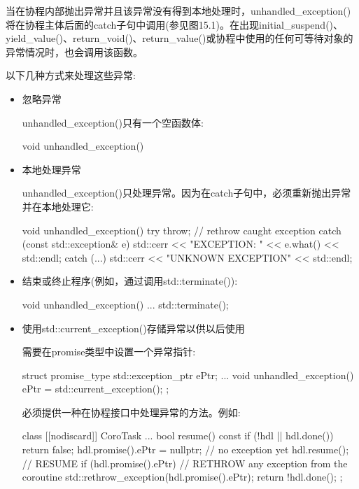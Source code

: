 当在协程内部抛出异常并且该异常没有得到本地处理时，unhandled\_exception()将在协程主体后面的catch子句中调用(参见图15.1)。在出现initial\_suspend()、yield\_value()、return\_void()、return\_value()或协程中使用的任何可等待对象的异常情况时，也会调用该函数。

以下几种方式来处理这些异常:

\begin{itemize}
\item 
忽略异常

unhandled\_exception()只有一个空函数体:

\begin{cpp}
void unhandled_exception() {
}
\end{cpp}

\item 
本地处理异常

unhandled\_exception()只处理异常。因为在catch子句中，必须重新抛出异常并在本地处理它:

\begin{cpp}
void unhandled_exception() {
	try {
		throw; // rethrow caught exception
	}
	catch (const std::exception& e) {
		std::cerr << "EXCEPTION: " << e.what() << std::endl;
	}
	catch (...) {
		std::cerr << "UNKNOWN EXCEPTION" << std::endl;
	}
}
\end{cpp}

\item 
结束或终止程序(例如，通过调用std::terminate()):

\begin{cpp}
void unhandled_exception() {
	...
	std::terminate();
}
\end{cpp}

\item 
使用std::current\_exception()存储异常以供以后使用 

需要在promise类型中设置一个异常指针:

\begin{cpp}
struct promise_type {
	std::exception_ptr ePtr;
	...
	void unhandled_exception() {
		ePtr = std::current_exception();
	}
};
\end{cpp}

必须提供一种在协程接口中处理异常的方法。例如:

\begin{cpp}
class [[nodiscard]] CoroTask {
	...
	bool resume() const {
		if (!hdl || hdl.done()) {
			return false;
		}
		hdl.promise().ePtr = nullptr; // no exception yet
		hdl.resume(); // RESUME
		if (hdl.promise().ePtr) { // RETHROW any exception from the coroutine
			std::rethrow_exception(hdl.promise().ePtr);
		}
		return !hdl.done();
	}
};
\end{cpp}
\end{itemize}

